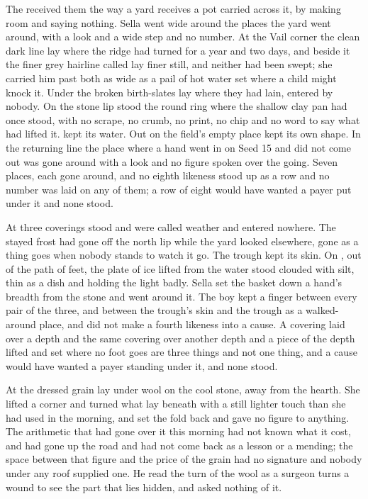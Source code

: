 The  received them the way a yard receives a pot carried across it, by making room and saying nothing. Sella went wide around the places the yard went around, with a look and a wide step and no number. At the Vail corner the clean dark line lay where the  ridge had turned for a year and two days, and beside it the finer grey hairline called  lay finer still, and neither had been swept; she carried him past both as wide as a pail of hot water set where a child might knock it. Under  the broken birth-slates lay where they had lain, entered by nobody. On the stone lip stood the round ring where the shallow clay pan had once stood, with no scrape, no crumb, no print, no chip and no word to say what had lifted it.  kept its water. Out on  the field's empty place kept its own shape. In the returning line the place where a hand went in on Seed 15 and did not come out was gone around with a look and no figure spoken over the going. Seven places, each gone around, and no eighth likeness stood up as a row and no number was laid on any of them; a row of eight would have wanted a payer put under it and none stood.

At  three coverings stood and were called weather and entered nowhere. The stayed frost had gone off the north lip while the yard looked elsewhere, gone as a thing goes when nobody stands to watch it go. The trough kept its skin. On , out of the path of feet, the plate of ice lifted from the water stood clouded with silt, thin as a dish and holding the light badly. Sella set the basket down a hand's breadth from the stone and went around it. The boy kept a finger between every pair of the three, and between the trough's skin and the trough as a walked-around place, and did not make a fourth likeness into a cause. A covering laid over a depth and the same covering over another depth and a piece of the depth lifted and set where no foot goes are three things and not one thing, and a cause would have wanted a payer standing under it, and none stood.

At  the dressed grain lay under wool on the cool stone, away from the hearth. She lifted a corner and turned what lay beneath with a still lighter touch than she had used in the morning, and set the fold back and gave no figure to anything. The arithmetic that had gone over it this morning had not known what it cost, and had gone up the road and had not come back as a lesson or a mending; the space between that figure and the price of the grain had no signature and nobody under any roof supplied one. He read the turn of the wool as a surgeon turns a wound to see the part that lies hidden, and asked nothing of it.

